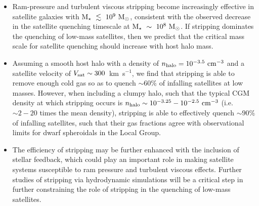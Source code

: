 \begin{itemize}[leftmargin=0.25cm]

\item Ram-pressure and turbulent viscous stripping become increasingly
  effective in satellite galaxies with ${\rm M}_{\star}~\lesssim~10^{9}~{\rm M}_{\odot}$,
  consistent with the observed decrease in the satellite quenching
  timescale at ${\rm M}_{\star}~\sim~10^{8}~{\rm M}_{\odot}$. If stripping dominates the
  quenching of low-mass satellites, then we predict that the critical
  mass scale
  for satellite quenching should increase with host halo mass.  \\

\item Assuming a smooth host halo with a density of $n_{\rm halo} =
  10^{-3.5}~{\rm cm}^{-3}$ and a satellite velocity of $V_{\rm sat}
  \sim 300$~km~s$^{-1}$, we find that stripping is able to remove
  enough cold gas so as to quench $\sim60\%$ of infalling satellites
  at low masses.
%
  However, when including a clumpy halo, such that the typical CGM
  density at which stripping occurs is $n_{\rm halo} \sim 10^{-3.25} -
  10^{-2.5}~{\rm cm}^{-3}$ (i.e.~$\sim2-20$ times the mean density),
  stripping is able to effectively quench $\sim90\%$ of infalling
  satellites, such that their gas fractions agree with observational
  limits for dwarf spheroidals in the Local Group. \\

\item The efficiency of stripping may be further enhanced with the
  inclusion of stellar feedback, which could play an important role in
  making satellite systems susceptible to ram pressure and turbulent
  viscous effects. Further studies of stripping via hydrodynamic
  simulations will be a critical step in further constraining the role
  of stripping in the quenching of low-mass satellites.


\end{itemize}


